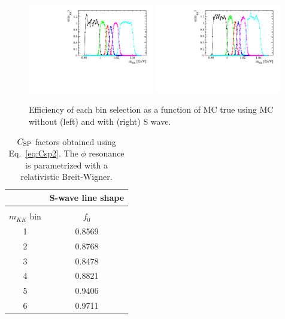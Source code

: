 \begin{figure}
\begin{center}
\includegraphics[width=0.49\textwidth]{figs/epsmKK.pdf}
\includegraphics[width=0.49\textwidth]{figs/epsmKK_SWave.pdf}
\caption{\small Efficiency of each \mKK bin selection as a function of MC true \mKK using MC without (left) and with (right) S wave.}
\label{fig:epsilon_m}
\end{center}
\end{figure}

\begin{table}[h]
        \caption{$C_{\rm SP}$ factors obtained using Eq.~\eqref{eq:Csp2}. The $\phi$ resonance is parametrized with a relativistic Breit-Wigner.}
        \begin{center}
        \begin{tabular}{c|c}
                                              & \multicolumn{1}{c}{S-wave line shape}\\
                                                \hline\\
                $m_{KK}$ bin             &$f_0$ \\ \hline
                1         	        & 0.8569 \\
                2                    & 0.8768  \\
                3                    & 0.8478  \\
                4                    & 0.8821  \\
                5                    & 0.9406  \\
                6                    & 0.9711  \\
        \end{tabular}
        \label{tab:CSP1}
        \end{center}
\end{table}

